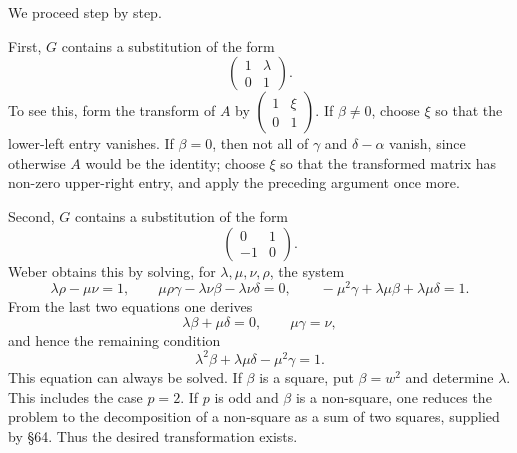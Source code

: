 \documentclass[11pt,a4paper]{book}
\begin{document}
We proceed step by step.

First, \(G\) contains a substitution of the form
\begin{equation}\label{eq:66-3}
 \begin{pmatrix}1&\lambda\\0&1\end{pmatrix}.
\end{equation}
To see this, form the transform of \(A\) by \(\begin{pmatrix}1&\xi\\0&1\end{pmatrix}\).  If \(\beta\ne0\), choose \(\xi\) so that the lower-left entry vanishes.  If \(\beta=0\), then not all of \(\gamma\) and \(\delta-\alpha\) vanish, since otherwise \(A\) would be the identity; choose \(\xi\) so that the transformed matrix has non-zero upper-right entry, and apply the preceding argument once more.

Second, \(G\) contains a substitution of the form
\begin{equation}\label{eq:66-5}
 \begin{pmatrix}0&1\\-1&0\end{pmatrix}.
\end{equation}
Weber obtains this by solving, for \(\lambda,\mu,\nu,\rho\), the system
\begin{equation}\label{eq:66-6}
 \lambda\rho-\mu\nu=1,
 \qquad \mu\rho\gamma-\lambda\nu\beta-\lambda\nu\delta=0,
 \qquad -\mu^2\gamma+\lambda\mu\beta+\lambda\mu\delta=1.
\end{equation}
From the last two equations one derives
\begin{equation}\label{eq:66-7}
 \lambda\beta+\mu\delta=0,
 \qquad \mu\gamma=\nu,
\end{equation}
and hence the remaining condition
\begin{equation}\label{eq:66-8}
 \lambda^2\beta+\lambda\mu\delta-\mu^2\gamma=1.
\end{equation}
This equation can always be solved.  If \(\beta\) is a square, put \(\beta=w^2\) and determine \(\lambda\).  This includes the case \(p=2\).  If \(p\) is odd and \(\beta\) is a non-square, one reduces the problem to the decomposition of a non-square as a sum of two squares, supplied by \S 64.  Thus the desired transformation exists.
\end{document}
